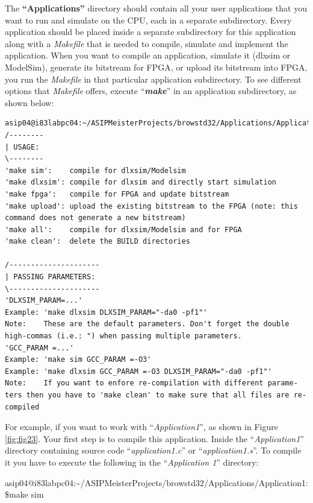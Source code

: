 The \textbf{``Applications''} directory should contain all your user
applications that you want to run and simulate on the CPU, each in a
separate subdirectory. Every application should be placed inside a
separate subdirectory for this application along with a \emph{Makefile}
that is needed to compile, simulate and implement the application. When
you want to compile an application, simulate it (dlxsim or ModelSim),
generate its bitstream for FPGA, or upload its bitstream into FPGA, you
run the \emph{Makefile} in that particular application subdirectory. To
see different options that \emph{Makefile} offers, execute
``\emph{\textbf{make}}'' in an application subdirectory, as shown below:
\begin{lstlisting}
asip04@i83labpc04:~/ASIPMeisterProjects/browstd32/Applications/Application1:$make
/--------
| USAGE:
\--------
'make sim':    compile for dlxsim/Modelsim
'make dlxsim': compile for dlxsim and directly start simulation
'make fpga':   compile for FPGA and update bitstream
'make upload': upload the existing bitstream to the FPGA (note: this command does not generate a new bitstream)
'make all':    compile for dlxsim/Modelsim and for FPGA
'make clean':  delete the BUILD directories

/---------------------
| PASSING PARAMETERS:
\---------------------
'DLXSIM_PARAM=...'
Example: 'make dlxsim DLXSIM_PARAM="-da0 -pf1"'
Note:    These are the default parameters. Don't forget the double high-commas (i.e.: ") when passing multiple parameters.
'GCC_PARAM =...'
Example: 'make sim GCC_PARAM =-O3'
Example: 'make dlxsim GCC_PARAM =-O3 DLXSIM_PARAM="-da0 -pf1"'
Note:    If you want to enfore re-compilation with different parame-ters then you have to 'make clean' to make sure that all files are re-compiled
\end{lstlisting}
For example, if you want to work with ``\emph{Application1}'', as shown
in Figure \ref{fig:fig23}. Your first step is to compile
this application. Inside the ``\emph{Application1}'' directory
containing source code ``\emph{application1.c}'' or
``\emph{application1.s}''. To compile it you have to execute the
following in the ``\emph{Application 1}'' directory:

asip04@i83labpc04:\textasciitilde/ASIPMeisterProjects/browstd32/Applications/Application1:\$make
sim

